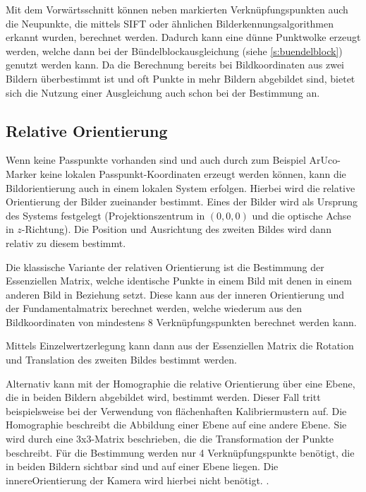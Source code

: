 \documentclass[./00PhotoBox.tex]{subfiles}
\begin{document}
Mit dem Vorwärts\-schnitt können neben markierten Verknüpfungspunkten auch die Neupunkte, die mittels SIFT oder ähnlichen Bild\-erkennungs\-algorithmen erkannt wurden, berechnet werden. Dadurch kann eine dünne Punktwolke erzeugt werden, welche dann bei der Bündelblockausgleichung (siehe \autoref{s:buendelblock}) genutzt werden kann. Da die Berechnung bereits bei Bildkoordinaten aus zwei Bildern überbestimmt ist und oft Punkte in mehr Bildern abgebildet sind, bietet sich die Nutzung einer Ausgleichung auch schon bei der Bestimmung an. \citep[S. 385]{luhmann}

\subsection{Relative Orientierung}
\label{ss:relative_orientierung}
Wenn keine Passpunkte vorhanden sind und auch durch zum Beispiel ArUco-Marker keine lokalen Passpunkt-Koordinaten erzeugt werden können, kann die Bildorientierung auch in einem lokalen System erfolgen. Hierbei wird die relative Orientierung der Bilder zueinander bestimmt. Eines der Bilder wird als Ursprung des Systems festgelegt (Projektionszentrum in $(0,0,0)$ und die optische Achse in $z$-Richtung). Die Position und Ausrichtung des zweiten Bildes wird dann relativ zu diesem bestimmt. \citep[S. 316]{luhmann}

Die klassische Variante der relativen Orientierung ist die Bestimmung der Essenziellen Matrix, welche identische Punkte in einem Bild mit denen in einem anderen Bild in Beziehung setzt. Diese kann aus der inneren Orientierung und der Fundamentalmatrix berechnet werden, welche wiederum aus den Bildkoordinaten von mindestens 8 Verknüpfungspunkten berechnet werden kann. \citep[S. 328ff]{luhmann}

Mittels Einzelwertzerlegung kann dann aus der Essenziellen Matrix die Rotation und Translation des zweiten Bildes bestimmt werden. \citep[S. 275]{hartley}

Alternativ kann mit der Homographie die relative Orientierung über eine Ebene, die in beiden Bildern abgebildet wird, bestimmt werden. Dieser Fall tritt beispielsweise bei der Verwendung von flächenhaften Kalibriermustern auf. Die Homographie beschreibt die Abbildung einer Ebene auf eine andere Ebene. Sie wird durch eine 3x3-Matrix beschrieben, die die Transformation der Punkte beschreibt. Für die Bestimmung werden nur 4 Verknüpfungspunkte benötigt, die in beiden Bildern sichtbar sind und auf einer Ebene liegen. Die \gls{innereOrientierung} der Kamera wird hierbei nicht benötigt. \citep[S. 33ff]{hartley}.
\end{document}
